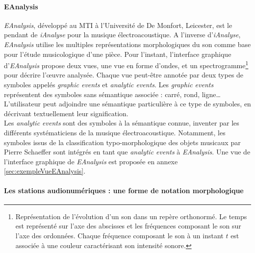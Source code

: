 \paragraph{EAnalysis} \textit{EAnalysis}, développé au MTI à l'Université de De Monfort, Leicester, est le pendant de \textit{iAnalyse} pour la musique électroacoustique. A l'inverse d'\textit{iAnalyse}, \textit{EAnalysis} utilise les multiples représentations morphologiques du son comme base pour l'étude musicologique d'une pièce. Pour l'instant, l'interface graphique d'\textit{EAnalysis} propose deux vues, une vue en forme d'ondes, et un spectrogramme\footnote{Représentation de l'évolution d'un son dans un repère orthonormé. Le temps est représenté sur l'axe des abscisses et les fréquences composant le son sur l'axe des ordonnées. Chaque fréquence composant le son à un instant $t$ est associée à une couleur caractérisant son intensité sonore.} pour décrire l'œuvre analysée.
Chaque vue peut-être annotée par deux types de symboles appelés \textit{graphic events} et \textit{analytic events}. Les \textit{graphic events} représentent des symboles sans sémantique associée : carré, rond, ligne…
L'utilisateur peut adjoindre une sémantique particulière à ce type de symboles, en décrivant textuellement leur signification.\\
Les \textit{analytic events} sont des symboles à la sémantique connue, inventer par les différents systématiciens de la musique électroacoustique. Notamment, les symboles issus de la classification typo-morphologique des objets musicaux par Pierre Schaeffer sont intégrés en tant que \textit{analytic events} à \textit{EAnalysis}. Une vue de l'interface graphique de \textit{EAnalysis} est proposée en annexe \ref{sec:exempleVueEAnalysis}.

\paragraph{Les stations audionumériques : une forme de notation morphologique}

    